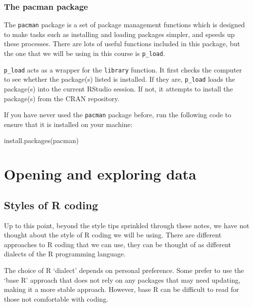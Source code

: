 \documentclass[
  letterpaper,
  DIV=11,
  numbers=noendperiod]{scrreprt}
\newenvironment{Shaded}{\begin{snugshade}}{\end{snugshade}}
\newcommand{\FunctionTok}[1]{\textcolor[rgb]{0.28,0.35,0.67}{#1}}
\newcommand{\NormalTok}[1]{\textcolor[rgb]{0.00,0.23,0.31}{#1}}
\newcommand{\StringTok}[1]{\textcolor[rgb]{0.13,0.47,0.30}{#1}}
\begin{document}
\subsection{The pacman package}\label{the-pacman-package}

The \texttt{pacman} package is a set of package management functions
which is designed to make tasks such as installing and loading packages
simpler, and speeds up these processes. There are lots of useful
functions included in this package, but the one that we will be using in
this course is \texttt{p\_load}.

\texttt{p\_load} acts as a wrapper for the \texttt{library} function. It
first checks the computer to see whether the package(s) listed is
installed. If they are, \texttt{p\_load} loads the package(s) into the
current RStudio session. If not, it attempts to install the package(s)
from the CRAN repository.

If you have never used the \texttt{pacman} package before, run the
following code to ensure that it is installed on your machine:

\begin{Shaded}
\begin{Highlighting}[]
\FunctionTok{install.packages}\NormalTok{(}\StringTok{\textquotesingle{}pacman\textquotesingle{}}\NormalTok{)}
\end{Highlighting}
\end{Shaded}


\chapter{Opening and exploring data}\label{opening-and-exploring-data}

\section{Styles of R coding}\label{styles-of-r-coding}

Up to this point, beyond the style tips sprinkled through these notes,
we have not thought about the style of R coding we will be using. There
are different approaches to R coding that we can use, they can be
thought of as different dialects of the R programming language.

The choice of R `dialect' depends on personal preference. Some prefer to
use the `base R' approach that does not rely on any packages that may
need updating, making it a more stable approach. However, base R can be
difficult to read for those not comfortable with coding.
\end{document}
